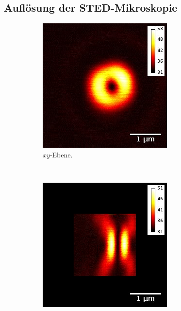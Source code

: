 \subsection{Auflösung der STED-Mikroskopie}
\begin{figure}
	\centering
	\begin{subfigure}{0.3\textwidth	}
		\includegraphics[width=\textwidth]{plots/GoldBeads_3d_775nmxywithbar.jpg}
		\caption{$xy$-Ebene.}
	\end{subfigure}
	~
	\begin{subfigure}{0.3\textwidth	}
		\includegraphics[width=\textwidth]{plots/GoldBeads_3d_775nmxzwithbar.jpg}

\end{subfigure}
\end{figure}

